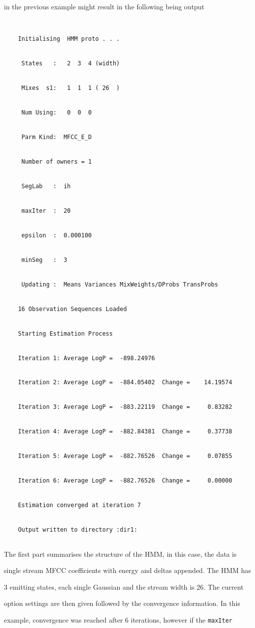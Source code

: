 in the previous example might result in the following being output


\begin{verbatim}


    Initialising  HMM proto . . . 


     States   :   2  3  4 (width)


     Mixes  s1:   1  1  1 ( 26  )


     Num Using:   0  0  0


     Parm Kind:  MFCC_E_D


     Number of owners = 1


     SegLab   :  ih


     maxIter  :  20


     epsilon  :  0.000100


     minSeg   :  3


     Updating :  Means Variances MixWeights/DProbs TransProbs


    16 Observation Sequences Loaded


    Starting Estimation Process


    Iteration 1: Average LogP =  -898.24976


    Iteration 2: Average LogP =  -884.05402  Change =    14.19574


    Iteration 3: Average LogP =  -883.22119  Change =     0.83282


    Iteration 4: Average LogP =  -882.84381  Change =     0.37738


    Iteration 5: Average LogP =  -882.76526  Change =     0.07855


    Iteration 6: Average LogP =  -882.76526  Change =     0.00000


    Estimation converged at iteration 7


    Output written to directory :dir1:


\end{verbatim}


The first part summarises the structure of the HMM, in this case, the data is


single stream MFCC coefficients with energy and deltas appended.  The HMM has


3 emitting states, each single Gaussian and the stream width is 26.  The current


option settings are then given followed by the convergence information.  In this


example, convergence was reached after 6 iterations, however if the \texttt{maxIter}


